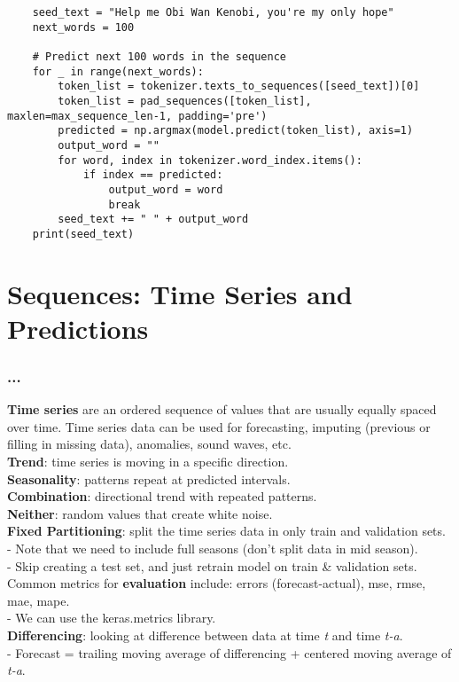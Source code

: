 \documentclass[11pt, a4paper]{article}
\begin{document}
\begin{spacing}{1.1}
	\begin{lstlisting}
	seed_text = "Help me Obi Wan Kenobi, you're my only hope"
	next_words = 100
	
	# Predict next 100 words in the sequence
	for _ in range(next_words):
		token_list = tokenizer.texts_to_sequences([seed_text])[0]
		token_list = pad_sequences([token_list], maxlen=max_sequence_len-1, padding='pre')
		predicted = np.argmax(model.predict(token_list), axis=1)
		output_word = ""
		for word, index in tokenizer.word_index.items():
			if index == predicted:
				output_word = word
				break
		seed_text += " " + output_word
	print(seed_text) \end{lstlisting} \newpage

	\section{Sequences: Time Series and Predictions}
	\subsubsection{...}
	\textbf{Time series} are an ordered sequence of values that are usually equally spaced over time. Time series data can be used for forecasting, imputing (previous or filling in missing data), anomalies, sound waves, etc. \vspace*{2mm}\\
	\textbf{Trend}: time series is moving in a specific direction.\\
	\textbf{Seasonality}: patterns repeat at predicted intervals.\\
	\textbf{Combination}: directional trend with repeated patterns. \\
	\textbf{Neither}: random values that create white noise. \\
	\textbf{Fixed Partitioning}: split the time series data in only train and validation sets.\\
	\hspace*{3mm} - Note that we need to include full seasons (don't split data in mid season). \\
	\hspace*{3mm} - Skip creating a test set, and just retrain model on train \& validation sets.\vspace*{2mm}\\
	Common metrics for \textbf{evaluation} include: errors (forecast-actual), mse, rmse, mae, mape. \\
	\hspace*{3mm} - We can use the keras.metrics library. \\
	\textbf{Differencing}: looking at difference between data at time \textit{t} and time \textit{t-a}. \\
	\hspace*{3mm} - Forecast = trailing moving average of differencing + centered moving average of \textit{t-a}. \\
	

\end{spacing}
\end{document}
